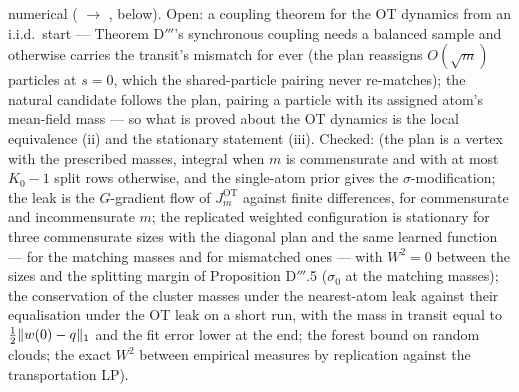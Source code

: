 {numerical ( $\to$ , below). Open: a coupling theorem for the OT
dynamics from an i.i.d.\ start --- Theorem D$'''$'s synchronous coupling needs a balanced sample and otherwise
carries the transit's mismatch for ever (the plan reassigns $O(\sqrt m)$ particles at $s = 0$, which the
shared-particle pairing never re-matches); the natural candidate follows the plan, pairing a particle with its
assigned atom's mean-field mass --- so what is proved about the OT dynamics is the local equivalence (ii) and the
stationary statement (iii). Checked:  (the plan is a vertex with the prescribed masses,
integral when $m$ is commensurate and with at most $K_0 - 1$ split rows otherwise, and the single-atom prior gives
the $\sigma$-modification; the leak is the $G$-gradient flow of $J_m^{\mathrm{OT}}$ against finite differences, for
commensurate and incommensurate $m$; the replicated weighted configuration is stationary for three commensurate
sizes with the diagonal plan and the same learned function --- for the matching masses and for mismatched ones ---
with $W^2 = 0$ between the sizes and the splitting margin of Proposition D$'''$.5 ($\sigma_0$ at the matching
masses); the conservation of the cluster masses under the nearest-atom leak against their equalisation under the OT
leak on a short run, with the mass in transit equal to $\frac12\lVert w(0) - q\rVert_1$ and the fit error lower at the
end; the forest bound on random clouds; the exact $W^2$ between empirical measures by replication against the
transportation LP).}

